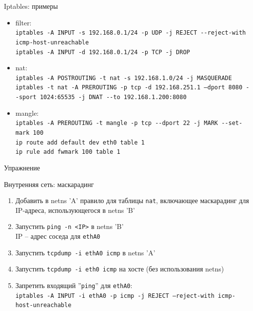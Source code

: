 \begin{frame}{Iptables: примеры}

	\small
	\begin{itemize}
		\item filter:\\
			{\tt iptables -A INPUT -s 192.168.0.1/24 -p UDP -j REJECT -{}-reject-with icmp-host-unreachable}\\
			{\tt iptables -A INPUT -d 192.168.0.1/24 -p TCP -j DROP}
		\item nat:\\
			{\tt iptables -A POSTROUTING -t nat -s 192.168.1.0/24 -j MASQUERADE}\\
			{\tt iptables -t nat -A PREROUTING -p tcp -d 192.168.251.1 
			--dport 8080 -{}-sport 1024:65535 -j DNAT -{}-to 192.168.1.200:8080}
		\item mangle:\\
			{\tt iptables -A PREROUTING -t mangle -p tcp -{}-dport 22 -j MARK -{}-set-mark 100}\\
			{\tt ip route add default dev eth0 table 1}\\
			{\tt ip rule add fwmark 100 table 1}
	\end{itemize}

\end{frame}


\begin{frame}[fragile]{Упражнение}
    \begin{block}{Внутренняя сеть: маскарадинг}
        \begin{enumerate}
            \item Добавить в netns 'A' правило для таблицы {\tt nat},
                включающее маскарадинг для IP-адреса, использующегося в netns 'B'
            \item Запустить {\tt ping -n <IP>} в netns 'B'\\
                IP -- адрес соседа для {\tt ethA0}
            \item Запустить {\tt tcpdump -i ethA0 icmp} в netns 'A'
            \item Запустить {\tt tcpdump -i eth0 icmp} на хосте (без использования netns)
            \item Запретить входящий ''{\tt ping}'' для {\tt ethA0}:\\
                {\tt iptables -A INPUT -i ethA0 -p icmp -j REJECT --reject-with icmp-host-unreachable}
        \end{enumerate}
    \end{block}
\end{frame}
